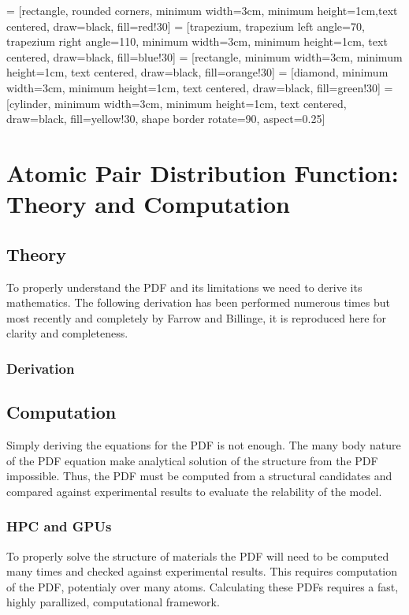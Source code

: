  = [rectangle, rounded corners, minimum width=3cm, minimum height=1cm,text centered, draw=black, fill=red!30]
 = [trapezium, trapezium left angle=70, trapezium right angle=110, minimum width=3cm, minimum height=1cm, text centered, draw=black, fill=blue!30]
 = [rectangle, minimum width=3cm, minimum height=1cm, text centered, draw=black, fill=orange!30]
 = [diamond, minimum width=3cm, minimum height=1cm, text centered, draw=black, fill=green!30]
\usetikzlibrary{shapes.geometric}
 = [cylinder, minimum width=3cm, minimum height=1cm, text centered, draw=black, fill=yellow!30, shape border rotate=90, aspect=0.25]

\chapter{Atomic Pair Distribution Function: \\Theory and Computation}
\section{Theory}
To properly understand the PDF and its limitations we need to derive its mathematics.
The following derivation has been performed numerous times but most recently and completely by Farrow and Billinge, it is reproduced here for clarity and completeness.
\subsection{Derivation}


\section{Computation}
Simply deriving the equations for the PDF is not enough.
The many body nature of the PDF equation make analytical solution of the structure from the PDF impossible.
Thus, the PDF must be computed from a structural candidates and compared against experimental results to evaluate the relability of the model.

\subsection{HPC and GPUs}
To properly solve the structure of materials the PDF will need to be computed many times and checked against experimental results.
This requires computation of the PDF, potentialy over many atoms.
Calculating these PDFs requires a fast, highly parallized, computational framework.
